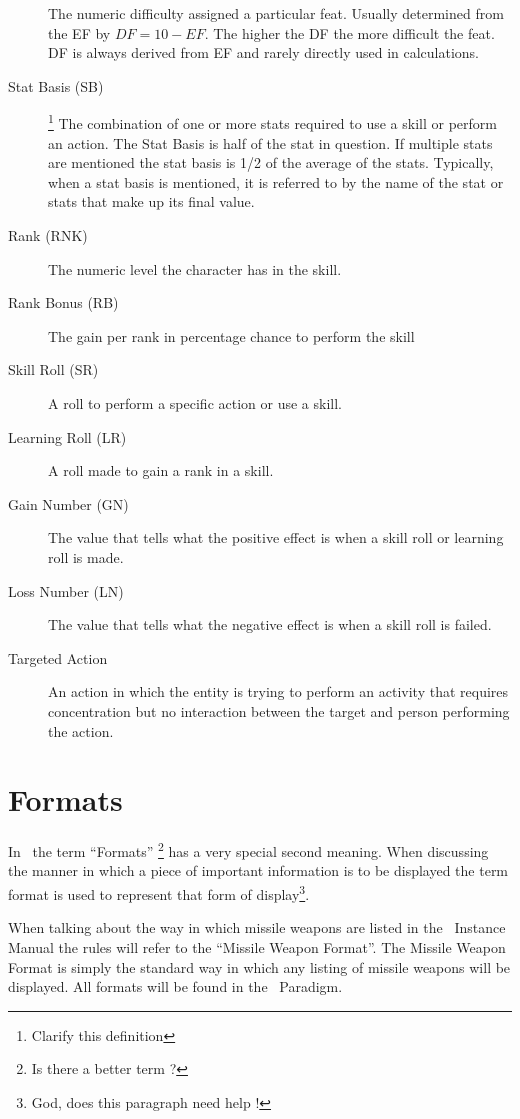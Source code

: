 \begin{description}
	The numeric difficulty assigned a particular feat. Usually determined from
	the EF by \(DF = 10-EF\). The higher the DF the more difficult the feat. DF is
	always derived from EF and rarely directly used in calculations.
	\item[Stat Basis (SB)] \footnote{Clarify this definition}
	The combination of one or more stats required to use a skill or perform an
    action. The Stat Basis is half of the stat in question. If 
	multiple stats are mentioned the stat basis is 1/2 of the average 
	of the stats. Typically, when a stat basis is mentioned, it is referred 
	to by the name of the stat or stats that make up its final value.
	\item[Rank (RNK)] 
	The numeric level the character has in the skill.
	\item[Rank Bonus (RB)]
	The gain per rank in percentage chance to perform the skill
	\item[Skill Roll (SR)]
	A roll to perform a specific action or use a skill.
	\item[Learning Roll (LR)]
	A roll made to gain a rank in a skill.
	\item[Gain Number (GN)]
	The value that tells what the positive effect is when a skill roll or
	learning roll is made.
    \item[Loss Number (LN)] 
	The value that tells what the negative effect is when a skill roll 
	is failed.
	\item[Targeted Action] 
	An action in which the entity is trying to perform an activity 
	that requires concentration but no interaction between the target 
	and person performing the action.
\end{description}

\section{Formats}

In \SH\ the term ``Formats'' \footnote{Is there a better term ? }
has a very special second meaning. When discussing the manner in 
which a piece of important information is to be displayed the term 
format is used to represent that form of display\footnote{God, does 
this paragraph need help !}. 

When talking about the way in which missile weapons are listed in the 
\SH\ Instance Manual the rules will refer to the 
``Missile Weapon Format''. The Missile Weapon Format is simply the 
standard way in which any listing of missile weapons will be displayed.
All formats will be found in the \SH\ Paradigm.


